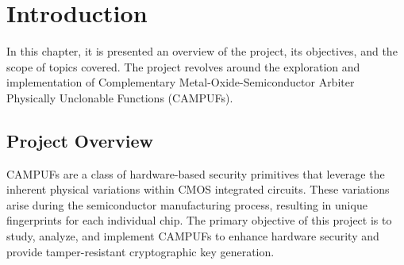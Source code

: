 \chapter{Introduction}


In this chapter, it is presented an overview of the project, its objectives, and the scope of topics covered. The project revolves around the exploration and implementation of Complementary Metal-Oxide-Semiconductor Arbiter Physically Unclonable Functions (CAMPUFs).
\section {Project Overview}
CAMPUFs are a class of hardware-based security primitives that leverage the inherent physical variations within CMOS integrated circuits. These variations arise during the semiconductor manufacturing process, resulting in unique fingerprints for each individual chip. The primary objective of this project is to study, analyze, and implement CAMPUFs to enhance hardware security and provide tamper-resistant cryptographic key generation.

